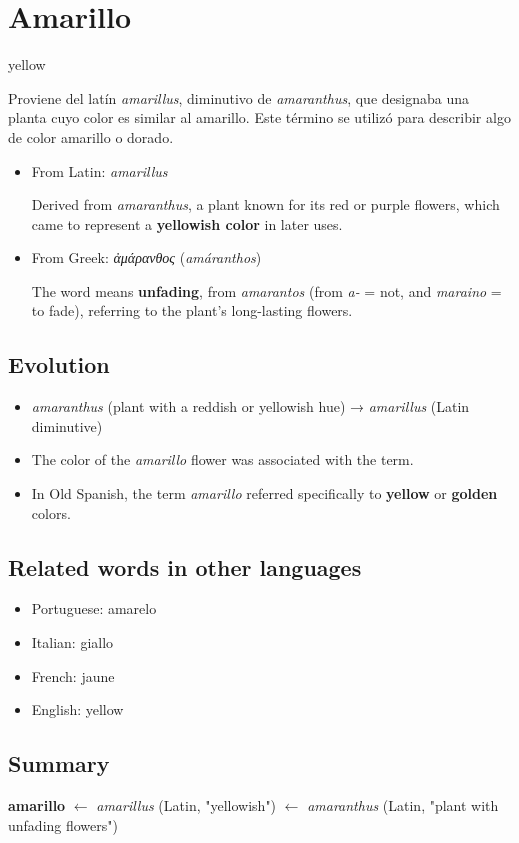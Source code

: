 \documentclass[10pt]{book}
\newcommand{\wordentry}[2]{
	\large #1
	\vspace{-0.5em}
	\begin{etymologybox}
		#2
	\end{etymologybox}
}
\let\oldsection\section
\renewcommand{\section}[1]{
	\needspace{8\baselineskip}
	\oldsection{#1}
}
\begin{document}
	\section{Amarillo}
	\wordentry{yellow}{
		Proviene del latín \textit{amarillus}, diminutivo de \textit{amaranthus}, que designaba una planta cuyo color es similar al amarillo. Este término se utilizó para describir algo de color amarillo o dorado.
		\begin{itemize}
			\item From Latin: \textit{amarillus}
			
			Derived from \textit{amaranthus}, a plant known for its red or purple flowers, which came to represent a \textbf{yellowish color} in later uses.
			
			\item From Greek: \textit{ἀμάρανθος} (\textit{amáranthos})
			
			The word means \textbf{unfading}, from \textit{amarantos} (from \textit{a-} = not, and \textit{maraino} = to fade), referring to the plant's long-lasting flowers.
		\end{itemize}
	}
	
	\subsection*{Evolution}
	\begin{itemize}
		\item \textit{amaranthus} (plant with a reddish or yellowish hue) → \textit{amarillus} (Latin diminutive)
		\item The color of the \textit{amarillo} flower was associated with the term.
		\item In Old Spanish, the term \textit{amarillo} referred specifically to \textbf{yellow} or \textbf{golden} colors.
	\end{itemize}
	
	\subsection*{Related words in other languages}
	\begin{itemize}
		\item Portuguese: amarelo
		\item Italian: giallo
		\item French: jaune
		\item English: yellow
	\end{itemize}
	
	\subsection*{Summary}
	\textbf{amarillo} $\leftarrow$ \textit{amarillus} (Latin, "yellowish") $\leftarrow$ \textit{amaranthus} (Latin, "plant with unfading flowers")
	
\end{document}
